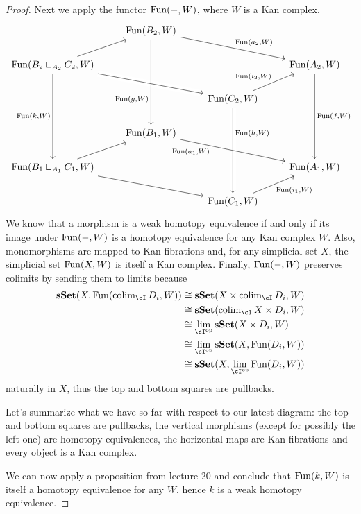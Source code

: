 \documentclass[a4paper,11pt,openany]{scrartcl}
\begin{document}
\begin{proof}
    Next we apply the functor $\operatorname{Fun}(-,W)$, where $W$ is a Kan
    complex.
    \[\begin{tikzcd}
        & {\Fun(B_2,W)} \\
        {\Fun(B_2\sqcup_{A_2}C_2,W)} &&& {\Fun(A_2,W)} \\
        && {\Fun(C_2,W)} \\
        & {\Fun(B_1,W)} \\
        {\Fun(B_1\sqcup_{A_1}C_1,W)} &&& {\Fun(A_1,W)} \\
        && {\Fun(C_1,W)}
        \arrow["{\Fun(h,W)}"{pos=0.3}, from=3-3, to=6-3, crossing over]
        \arrow[from=5-1, to=6-3]
        \arrow["{\Fun(i_1,W)}"', from=6-3, to=5-4]
        \arrow[from=5-1, to=4-2]
        \arrow["{\Fun(a_1,W)}"'{pos=0.3}, from=4-2, to=5-4]
        \arrow["{\Fun(f,W)}", from=2-4, to=5-4]
        \arrow["{\Fun(k,W)}"', from=2-1, to=5-1]
        \arrow[from=2-1, to=3-3, crossing over]
        \arrow["{\Fun(a_2,W)}", from=1-2, to=2-4]
        \arrow["{\Fun(i_2,W)}", from=3-3, to=2-4]
        \arrow[from=2-1, to=1-2]
        \arrow["{\Fun(g,W)}"'{pos=0.7}, from=1-2, to=4-2]
    \end{tikzcd}\]
    We know that a morphism is a weak homotopy equivalence if and only if its
    image under $\operatorname{Fun}(-,W)$ is a homotopy equivalence for any Kan complex
    $W$. Also, monomorphisms are mapped to Kan fibrations and, for any
    simplicial set $X$, the simplicial set $\operatorname{Fun}(X,W)$ is itself a Kan complex.
    Finally, $\operatorname{Fun}(-,W)$ preserves colimits by sending them to limits because
    \begin{align*}
        \sSet(X,\Fun(\colim_{\cI}D_i,W))
        &\cong\sSet(X\times\colim_{\cI}D_i,W) \\
        &\cong\sSet(\colim_{\cI} X\times D_i,W) \\
        &\cong\lim_{\cI^{\op}}\sSet(X\times D_i,W) \\
        &\cong\lim_{\cI^{\op}}\sSet(X,\Fun(D_i,W)) \\
        &\cong\sSet(X,\lim_{\cI^{\op}}\Fun(D_i,W))
    \end{align*}
    naturally in $X$, thus the top and bottom squares are pullbacks.

    Let's summarize what we have so far with respect to our latest diagram: the
    top and bottom squares are pullbacks, the vertical morphisms (except for
    possibly the left one) are homotopy equivalences, the horizontal maps are
    Kan fibrations and every object is a Kan complex.

    We can now apply a proposition from lecture 20 and conclude that $\operatorname{Fun}(k,W)$
    is itself a homotopy equivalence for any $W$, hence $k$ is a weak homotopy
    equivalence.
\end{proof}
\end{document}
